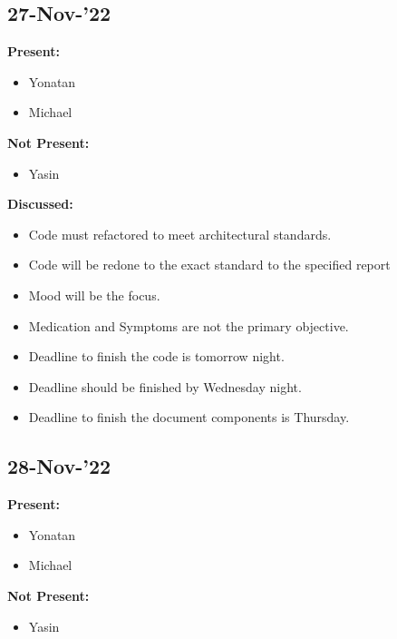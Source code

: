 \documentclass[11pt]{article}
\begin{document}
    \subsection{27-Nov-’22}\label{subsec:27-nov-22}
    \textbf{Present:}
    \begin{itemize}
        \item Yonatan
        \item Michael
    \end{itemize}

    \textbf{Not Present:}

    \begin{itemize}
        \item Yasin
    \end{itemize}

    \textbf{Discussed:}
    \begin{itemize}
        \item Code must refactored to meet architectural standards.
        \item Code will be redone to the exact standard to the specified report
        \item Mood will be the focus.
        \item Medication and Symptoms are not the primary objective.
        \item Deadline to finish the code is tomorrow night.
        \item Deadline should be finished by Wednesday night.
        \item Deadline to finish the document components is Thursday.
    \end{itemize}

    \subsection{28-Nov-’22}\label{subsec:28-nov-22}

    \textbf{Present:}
    \begin{itemize}
        \item Yonatan
        \item Michael
    \end{itemize}

    \textbf{Not Present:}

    \begin{itemize}
        \item Yasin
    \end{itemize}
\end{document}
